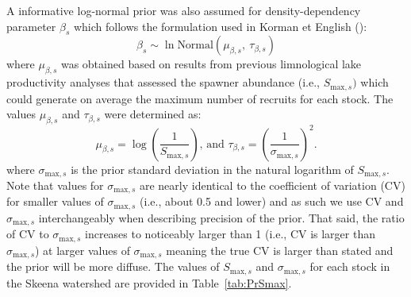 \documentclass[french,11pt]{book}
\begin{document}
A informative log-normal prior was also assumed for density-dependency parameter \(\beta_s\) which follows the formulation used in Korman et English ():
\begin{equation}
  \beta_s \sim \ln \textrm{Normal}\left(\mu_{\beta,s},\ \tau_{\beta,s}\right)
\end{equation}
where \(\mu_{\beta,s}\) was obtained based on results from previous limnological lake productivity analyses that assessed the spawner abundance (i.e., \(S_{\textrm{max},s})\) which could generate on average the maximum number of recruits for each stock. The values \(\mu_{\beta,s}\) and \(\tau_{\beta,s}\) were determined as:
\begin{equation}
  \mu_{\beta,s}= \log \left(  \frac{1}{S_{\textrm{max},s}} \right)
  \textrm{,  and  } 
  \tau_{\beta,s}=\left(\frac{1}{\sigma_{\textrm{max},s}}\right)^2.
\end{equation}
where \(\sigma_{\textrm{max},s}\) is the prior standard deviation in the natural logarithm of \(S_{\textrm{max},s}\). Note that values for \(\sigma_{\textrm{max},s}\) are nearly identical to the coefficient of variation (CV) for smaller values of \(\sigma_{\textrm{max},s}\) (i.e., about 0.5 and lower) and as such we use CV and \(\sigma_{\textrm{max},s}\) interchangeably when describing precision of the prior. That said, the ratio of CV to \(\sigma_{\textrm{max},s}\) increases to noticeably larger than 1 (i.e., CV is larger than \(\sigma_{\textrm{max},s}\)) at larger values of \(\sigma_{\textrm{max},s}\) meaning the true CV is larger than stated and the prior will be more diffuse. The values of \(S_{\textrm{max},s}\) and \(\sigma_{\textrm{max},s}\) for each stock in the Skeena watershed are provided in Table~\ref{tab:PrSmax}.
\end{document}
